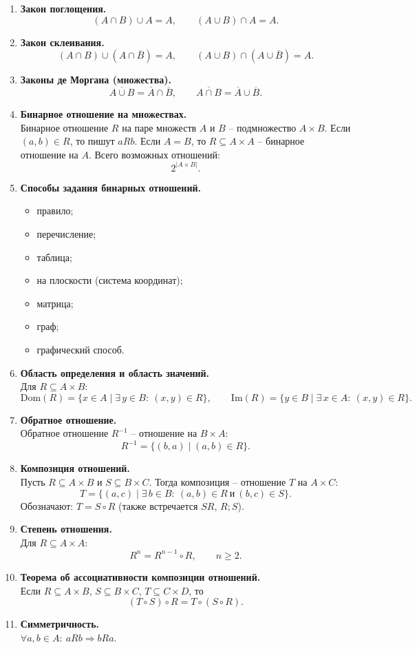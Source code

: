\documentclass[a4paper,12pt,oneside]{article}
\newcommand{\Dom}{\mathrm{Dom}}
\newcommand{\Im}{\mathrm{Im}}
\newcommand{\DefItem}[2]{\item \textbf{#1}\\#2}
\begin{document}
\begin{enumerate}[label=\arabic*.]
\DefItem{Закон поглощения.}{
\[
(A \cap B)\cup A = A,
\qquad
(A \cup B)\cap A = A.
\]}

\DefItem{Закон склеивания.}{
\[
(A \cap B)\cup(A \cap \overline{B})=A,
\qquad
(A \cup B)\cap(A \cup \overline{B})=A.
\]}

\DefItem{Законы де Моргана (множества).}{
\[
\overline{A \cup B} = \overline{A} \cap \overline{B},
\qquad
\overline{A \cap B} = \overline{A} \cup \overline{B}.
\]}

\DefItem{Бинарное отношение на множествах.}{Бинарное отношение $R$ на паре множеств $A$ и $B$ – подмножество $A \times B$. Если $(a,b)\in R$, то пишут $aRb$. Если $A=B$, то $R\subseteq A\times A$ – бинарное отношение на $A$. Всего возможных отношений:
\[
2^{|A\times B|}.
\]}

\DefItem{Способы задания бинарных отношений.}{
\begin{itemize}
\item правило;
\item перечисление;
\item таблица;
\item на плоскости (система координат);
\item матрица;
\item граф;
\item графический способ.
\end{itemize}}

\DefItem{Область определения и область значений.}{Для $R\subseteq A\times B$:
\[
\Dom(R)=\{x \in A \mid \exists\,y \in B:\ (x,y)\in R\},
\qquad
\Im(R)=\{y \in B \mid \exists\,x \in A:\ (x,y)\in R\}.
\]}

\DefItem{Обратное отношение.}{Обратное отношение $R^{-1}$ – отношение на $B \times A$:
\[
R^{-1}=\{(b,a)\mid (a,b)\in R\}.
\]}

\DefItem{Композиция отношений.}{Пусть $R\subseteq A\times B$ и $S\subseteq B\times C$. Тогда композиция – отношение $T$ на $A\times C$:
\[
T=\{(a,c)\mid \exists\,b \in B:\ (a,b)\in R \ \text{и}\ (b,c)\in S\}.
\]
Обозначают: $T=S\circ R$ (также встречается $SR$, $R;S$).}

\DefItem{Степень отношения.}{Для $R\subseteq A\times A$:
\[
R^n = R^{n-1}\circ R,\qquad n\ge 2.
\]}

\DefItem{Теорема об ассоциативности композиции отношений.}{Если $R\subseteq A\times B$, $S\subseteq B\times C$, $T\subseteq C\times D$, то
\[
(T\circ S)\circ R = T\circ (S\circ R).
\]}

\DefItem{Симметричность.}{$\forall a,b\in A:\ aRb \Rightarrow bRa$.}


\end{enumerate}
\end{document}
